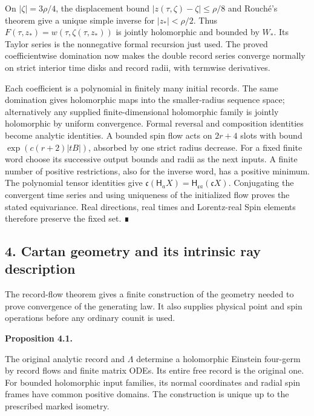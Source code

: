 \documentclass[
  english,
  11pt,
  reqno]{amsart}
\makeatletter
\newcommand{\pandocstatementheading}[1]{%
  \par\addpenalty{\@beginparpenalty}%
  \addvspace{.5\baselineskip plus .2\baselineskip minus .2\baselineskip}%
  {\normalfont\bfseries #1\par}%
  \nobreak\@afterindenttrue\@afterheading
}
\makeatother
\begin{document}
On \(|\zeta|=3\rho/4\), the displacement bound
\(|z(\tau,\zeta)-\zeta|\le\rho/8\) and Rouché's theorem give a unique
simple inverse for \(|z_*|<\rho/2\). Thus
\(F(\tau,z_*)=w(\tau,\zeta(\tau,z_*))\) is jointly holomorphic and
bounded by \(W_*\). Its Taylor series is the nonnegative formal
recursion just used. The proved coefficientwise domination now makes the
double record series converge normally on strict interior time disks and
record radii, with termwise derivatives.

Each coefficient is a polynomial in finitely many initial records. The
same domination gives holomorphic maps into the smaller-radius sequence
space; alternatively any supplied finite-dimensional holomorphic family
is jointly holomorphic by uniform convergence. Formal reversal and
composition identities become analytic identities. A bounded spin flow
acts on \(2r+4\) slots with bound \(\exp(c(r+2)|tB|)\), absorbed by one
strict radius decrease. For a fixed finite word choose its successive
output bounds and radii as the next inputs. A finite number of positive
restrictions, also for the inverse word, has a positive minimum. The
polynomial tensor identities give
\(\mathfrak c(\mathsf H_aX)=\mathsf H_{\mathfrak ca}(\mathfrak cX)\).
Conjugating the convergent time series and using uniqueness of the
initialized flow proves the stated equivariance. Real directions, real
times and Lorentz-real Spin elements therefore preserve the fixed set. ∎

\protect{}\label{sec:gg-cartan}

\subsection{4. Cartan geometry and its intrinsic ray
description}\label{cartan-geometry-and-its-intrinsic-ray-description}

The record-flow theorem gives a finite construction of the geometry
needed to prove convergence of the generating law. It also supplies
physical point and spin operations before any ordinary counit is used.

\pandocstatementheading{\protect{}\label{prop:gg-finite-cartan}Proposition 4.1.}

The original analytic record and \(\Lambda\) determine a holomorphic
Einstein four-germ by record flows and finite matrix ODEs. Its entire
free record is the original one. For bounded holomorphic input families,
its normal coordinates and radial spin frames have common positive
domains. The construction is unique up to the prescribed marked
isometry.
\end{document}
